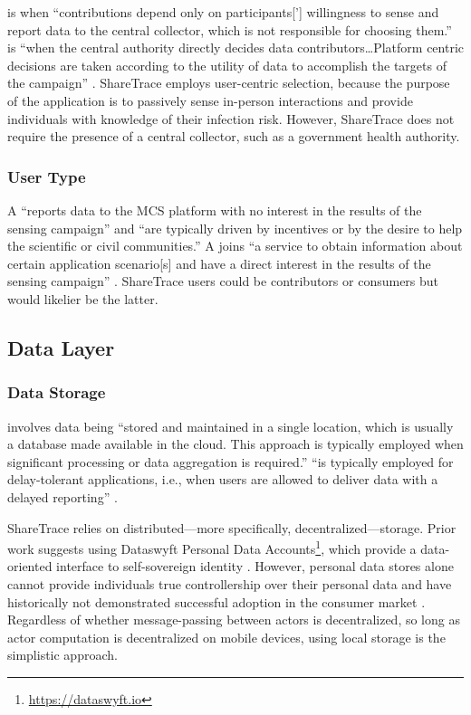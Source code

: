  is when ``contributions depend only on participants['] willingness to sense and report data to the central collector, which is not responsible for choosing them.''  is ``when the central authority directly decides data contributors{\ldots}Platform centric decisions are taken according to the utility of data to accomplish the targets of the campaign'' \citep{Capponi2019}. ShareTrace employs user-centric selection, because the purpose of the application is to passively sense in-person interactions and provide individuals with knowledge of their infection risk. However, ShareTrace does not require the presence of a central collector, such as a government health authority.

\subsubsection{User Type}

A  ``reports data to the MCS platform with no interest in the results of the sensing campaign'' and ``are typically driven by incentives or by the desire to help the scientific or civil communities.'' A  joins ``a service to obtain information about certain application scenario[s] and have a direct interest in the results of the sensing campaign'' \citep{Capponi2019}. ShareTrace users could be contributors or consumers but would likelier be the latter.

\subsection{Data Layer}

\subsubsection{Data Storage}

 involves data being ``stored and maintained in a single location, which is usually a database made available in the cloud. This approach is typically employed when significant processing or data aggregation is required.''  ``is typically employed for delay-tolerant applications, i.e., when users are allowed to deliver data with a delayed reporting'' \citep{Capponi2019}. 

ShareTrace relies on distributed---more specifically, decentralized---storage. Prior work \cite[\cref{ch:previous-designs}]{Ayday2020, Ayday2021} suggests using Dataswyft Personal Data Accounts\footnote{\url{https://dataswyft.io}}, which provide a data-oriented interface to self-sovereign identity \citep{Preukschat2021, Schardong2022}. However, personal data stores alone cannot provide individuals true controllership over their personal data and have historically not demonstrated successful adoption in the consumer market \citep{Narayanan2012}. Regardless of whether message-passing between actors is decentralized, so long as actor computation is decentralized on mobile devices, using local storage is the simplistic approach.

